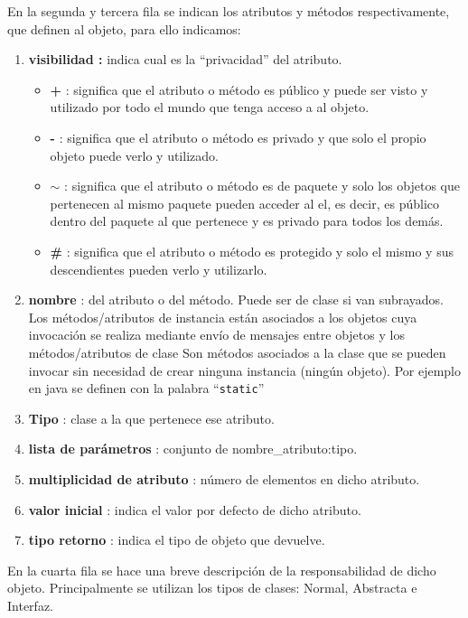 \documentclass[10pt,a4paper,titlepage]{article}
\begin{document}
En la segunda y tercera fila se indican los atributos y métodos respectivamente,  que definen al objeto, para ello indicamos:
\begin{enumerate}
\item \textbf{visibilidad :} indica cual es la ``privacidad'' del atributo.
	\begin{itemize}
	\item \textbf{+} : significa que el atributo o método es público y puede ser visto y utilizado por todo el mundo que tenga acceso a al objeto.
	\item \textbf{-} : significa que el atributo o método es privado y que solo el propio objeto puede verlo y utilizado.
	\item \textbf{$\sim$} : significa que el atributo o método es de paquete y solo los objetos que pertenecen al mismo paquete pueden acceder al el, es decir, es público dentro del paquete al que pertenece y es privado para todos los demás.
	\item \textbf{\#} : significa que el atributo o método es protegido y solo el mismo y sus descendientes pueden verlo y utilizarlo.
	\end{itemize}

\item \textbf{nombre} : del atributo o del método. Puede ser de clase si van subrayados. Los métodos/atributos de instancia están asociados a los objetos cuya invocación se realiza mediante envío de mensajes entre objetos y los métodos/atributos de clase Son métodos asociados a la clase que se pueden invocar sin necesidad de crear ninguna instancia (ningún objeto). Por ejemplo en java se definen con la palabra ``\texttt{static}''

\item \textbf{Tipo} : clase a la que pertenece ese atributo.
\item \textbf{lista de parámetros} : conjunto de nombre\_atributo:tipo.
\item \textbf{multiplicidad de atributo} : número de elementos en dicho atributo.
\item \textbf{valor inicial} : indica el valor por defecto de dicho atributo.
\item \textbf{tipo retorno} : indica el tipo de objeto que devuelve.

\end{enumerate}

En la cuarta fila se hace una breve descripción de la responsabilidad de dicho objeto.
Principalmente se utilizan los tipos de clases: Normal, Abstracta e Interfaz.\\
\end{document}
